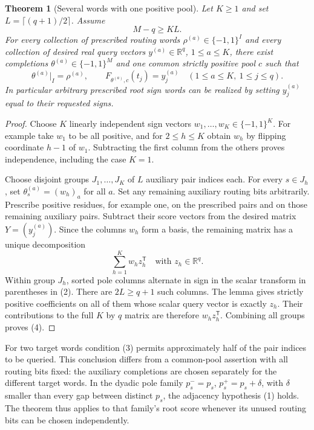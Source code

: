 \documentclass[11pt]{article}
\newtheorem{theorem}{Theorem}
\begin{document}
\begin{theorem}[Several words with one positive pool]
Let $K\geq1$ and set $L=\lceil(q+1)/2\rceil$. Assume
\[
                         M-q\geq KL.                          \tag{3}
\]
For every collection of prescribed routing words
$\rho^{(a)}\in\{-1,1\}^I$ and every collection of desired real
query vectors $y^{(a)}\in\mathbb R^q$, $1\leq a\leq K$, there
exist completions $\theta^{(a)}\in\{-1,1\}^M$ and one common
strictly positive pool $c$ such that
\[
 \theta^{(a)}|_I=\rho^{(a)},\qquad
 F_{\theta^{(a)},c}(t_j)=y_j^{(a)}
                   \quad(1\leq a\leq K,\ 1\leq j\leq q).
                                                               \tag{4}
\]
In particular arbitrary prescribed root sign words can be realized
by setting $y_j^{(a)}$ equal to their requested signs.
\end{theorem}
\begin{proof}
Choose $K$ linearly independent sign vectors
$w_1,\ldots,w_K\in\{-1,1\}^K$. For example take $w_1$ to be
all positive, and for $2\leq h\leq K$ obtain $w_h$ by flipping
coordinate $h-1$ of $w_1$. Subtracting the first column from the
others proves independence, including the case $K=1$.

Choose disjoint groups $J_1,\ldots,J_K$ of $L$ auxiliary pair
indices each. For every $s\in J_h$, set
$\theta_s^{(a)}=(w_h)_a$ for all $a$. Set any remaining auxiliary
routing bits arbitrarily. Prescribe positive residues, for example
one, on the prescribed pairs and on those remaining auxiliary
pairs. Subtract their score vectors from the desired matrix
$Y=(y_j^{(a)})$. Since the columns $w_h$ form a basis, the remaining
matrix has a unique decomposition
\[
                           \sum_{h=1}^K w_h z_h^{\mathsf T}
                \quad\text{with }z_h\in\mathbb R^q.
\]
Within group $J_h$, sorted pole columns alternate in sign in the
scalar transform in parentheses in (2). There are $2L\geq q+1$
such columns. The lemma gives strictly positive coefficients on
all of them whose scalar query vector is exactly $z_h$.
Their contributions to the full $K$ by $q$ matrix are therefore
$w_h z_h^{\mathsf T}$. Combining all groups proves (4).
\end{proof}

For two target words condition (3) permits approximately half of the
pair indices to be queried. This conclusion differs from a common-pool
assertion with all routing bits fixed: the auxiliary completions are
chosen separately for the different target words. In the dyadic pole
family $p_s^-=p_s$, $p_s^+=p_s+\delta$, with $\delta$ smaller than
every gap between distinct $p_s$, the adjacency hypothesis (1) holds.
The theorem thus applies to that family's root score whenever its
unused routing bits can be chosen independently.
\end{document}
